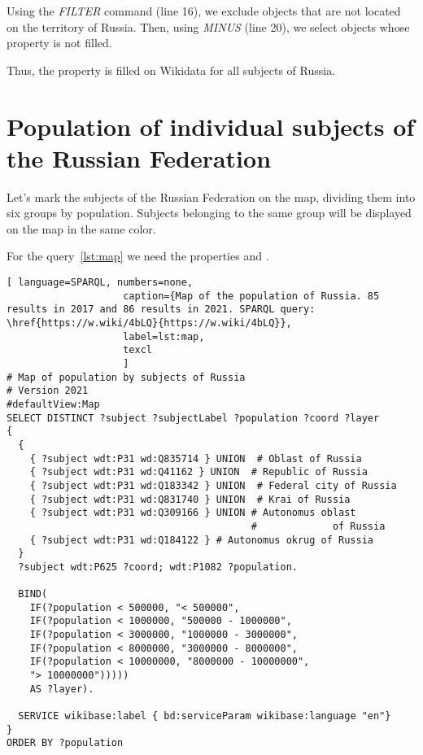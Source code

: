 Using the \textit{FILTER} command (line 16), we exclude objects that are not located on the territory of Russia. Then, using \textit{MINUS} (line 20), we select objects whose property  is not filled.

Thus, the  property is filled on Wikidata for all subjects of Russia.

\section{Population of individual subjects of the Russian Federation}

Let's mark the subjects of the Russian Federation on the map, dividing them into six groups by population. Subjects belonging to the same group will be displayed on the map in the same color.

For the query~\ref{lst:map} we need the properties  and .


\begin{lstlisting}[ language=SPARQL, numbers=none,
                    caption={Map of the population of Russia. 85 results in 2017 and 86 results in 2021. SPARQL query: \href{https://w.wiki/4bLQ}{https://w.wiki/4bLQ}},
                    label=lst:map,
                    texcl 
                    ]
# Map of population by subjects of Russia
# Version 2021
#defaultView:Map
SELECT DISTINCT ?subject ?subjectLabel ?population ?coord ?layer
{
  {
    { ?subject wdt:P31 wd:Q835714 } UNION  # Oblast of Russia
    { ?subject wdt:P31 wd:Q41162 } UNION  # Republic of Russia
    { ?subject wdt:P31 wd:Q183342 } UNION  # Federal city of Russia
    { ?subject wdt:P31 wd:Q831740 } UNION  # Krai of Russia
    { ?subject wdt:P31 wd:Q309166 } UNION # Autonomus oblast 
                                          #             of Russia
    { ?subject wdt:P31 wd:Q184122 } # Autonomus okrug of Russia
  }   
  ?subject wdt:P625 ?coord; wdt:P1082 ?population.
  
  BIND(
    IF(?population < 500000, "< 500000",
    IF(?population < 1000000, "500000 - 1000000",
    IF(?population < 3000000, "1000000 - 3000000",
    IF(?population < 8000000, "3000000 - 8000000",
    IF(?population < 10000000, "8000000 - 10000000",
    "> 10000000")))))
    AS ?layer).
  
  SERVICE wikibase:label { bd:serviceParam wikibase:language "en"}
}
ORDER BY ?population
\end{lstlisting}%

